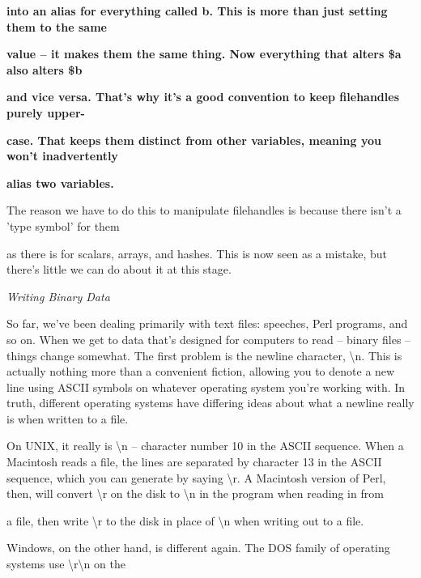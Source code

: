 \documentclass[a4paper,11pt]{book}
\begin{document}
\noindent \textbf{into an alias for everything called b. This is more than just setting them to the same}

\noindent \textbf{value -- it makes them the same thing. Now everything that alters \$a also alters \$b}

\noindent \textbf{and vice versa. That's why it's a good convention to keep filehandles purely upper-}

\noindent \textbf{case. That keeps them distinct from other variables, meaning you won't inadvertently}

\noindent \textbf{alias two variables.}

\noindent 

\noindent 

\noindent The reason we have to do this to manipulate filehandles is because there isn't a 'type symbol' for them

\noindent as there is for scalars, arrays, and hashes. This is now seen as a mistake, but there's little we can do about it at this stage.

\noindent 

\noindent \textit{Writing Binary Data}

\noindent So far, we've been dealing primarily with text files: speeches, Perl programs, and so on. When we get to data that's designed for computers to read -- binary files -- things change somewhat. The first problem is the newline character, \textbackslash n. This is actually nothing more than a convenient fiction, allowing you to denote a new line using ASCII symbols on whatever operating system you're working with. In truth, different operating systems have differing ideas about what a newline really is when written to a file.

\noindent 

\noindent On UNIX, it really is \textbackslash n -- character number 10 in the ASCII sequence. When a Macintosh reads a file, the lines are separated by character 13 in the ASCII sequence, which you can generate by saying \textbackslash r. A Macintosh version of Perl, then, will convert \textbackslash r on the disk to \textbackslash n in the program when reading in from

\noindent a file, then write \textbackslash r to the disk in place of \textbackslash n when writing out to a file.

\noindent 

\noindent 

\noindent Windows, on the other hand, is different again. The DOS family of operating systems use \textbackslash r\textbackslash n on the
\end{document}
